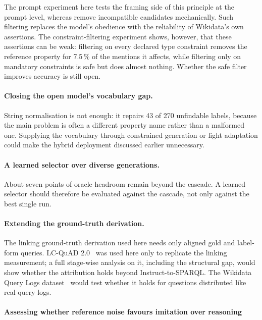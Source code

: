 The prompt experiment here tests the framing side of this principle at the prompt level, whereas \citet{zhang2026saga} remove incompatible candidates mechanically.
Such filtering replaces the model's obedience with the reliability of Wikidata's own assertions.
The constraint-filtering experiment shows, however, that these assertions can be weak: filtering on every declared type constraint removes the reference property for 7.5\,\% of the mentions it affects, while filtering only on mandatory constraints is safe but does almost nothing.
Whether the safe filter improves accuracy is still open.

\paragraph{Closing the open model's vocabulary
gap.}

String normalisation is not enough: it repairs 43 of 270 unfindable labels, because the main problem is often a different property name rather than a malformed one.
Supplying the vocabulary through constrained generation or light adaptation could make the hybrid deployment discussed earlier unnecessary.

\paragraph{A learned selector over diverse
generations.}

About seven points of oracle headroom remain beyond the cascade.
A learned selector should therefore be evaluated against the cascade, not only against the best single run.

\paragraph{Extending the ground-truth
derivation.}

The linking ground-truth derivation used here needs only aligned gold and label-form queries.
LC-QuAD 2.0~\parencite{dubey2019lcquad2} was used here only to replicate the linking measurement; a full stage-wise analysis on it, including the structural gap, would show whether the attribution holds beyond Instruct-to-SPARQL.
The Wikidata Query Logs dataset~\parencite{walter2026wdql} would test whether it holds for questions distributed like real query logs.

\paragraph{Assessing whether reference noise favours imitation over reasoning}

